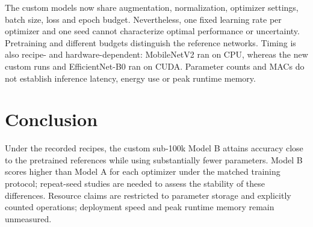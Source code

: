 \documentclass[11pt,a4paper]{article}
\begin{document}
The custom models now share augmentation, normalization, optimizer settings, batch size, loss and epoch budget. Nevertheless, one fixed learning rate per optimizer and one seed cannot characterize optimal performance or uncertainty. Pretraining and different budgets distinguish the reference networks. Timing is also recipe- and hardware-dependent: MobileNetV2 ran on CPU, whereas the new custom runs and EfficientNet-B0 ran on CUDA. Parameter counts and MACs do not establish inference latency, energy use or peak runtime memory.

\section{Conclusion}
Under the recorded recipes, the custom sub-100k Model B attains accuracy close to the pretrained references while using substantially fewer parameters. Model B scores higher than Model A for each optimizer under the matched training protocol; repeat-seed studies are needed to assess the stability of these differences. Resource claims are restricted to parameter storage and explicitly counted operations; deployment speed and peak runtime memory remain unmeasured.
\end{document}
